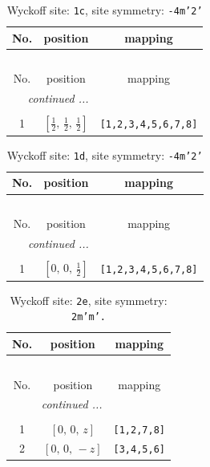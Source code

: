 \documentclass[fleqn,8pt]{jsarticle}
\begin{document}
\begin{longtable}{ccc}
\caption{Wyckoff site: {\tt 1c}, site symmetry: {\tt -4m'2'}}
 \\
 \hline \hline
No. & position & mapping \\ \hline \endfirsthead

\multicolumn{2}{l}{\tablename\ \thetable{}} \\
 \hline \hline
No. & position & mapping \\ \hline \endhead

 \hline \hline
\multicolumn{2}{r}{\footnotesize\it continued ...} \\ \endfoot

 \hline \hline
\multicolumn{2}{r}{} \\ \endlastfoot

1 & $\left[ \frac{1}{2},\, \frac{1}{2},\, \frac{1}{2} \right]$ & {\tt [1,2,3,4,5,6,7,8]} \\
\end{longtable}
\renewcommand{\arraystretch}{1.2}
\begin{longtable}{ccc}
\caption{Wyckoff site: {\tt 1d}, site symmetry: {\tt -4m'2'}}
 \\
 \hline \hline
No. & position & mapping \\ \hline \endfirsthead

\multicolumn{2}{l}{\tablename\ \thetable{}} \\
 \hline \hline
No. & position & mapping \\ \hline \endhead

 \hline \hline
\multicolumn{2}{r}{\footnotesize\it continued ...} \\ \endfoot

 \hline \hline
\multicolumn{2}{r}{} \\ \endlastfoot

1 & $\left[ 0,\, 0,\, \frac{1}{2} \right]$ & {\tt [1,2,3,4,5,6,7,8]} \\
\end{longtable}
\renewcommand{\arraystretch}{1.2}
\begin{longtable}{ccc}
\caption{Wyckoff site: {\tt 2e}, site symmetry: {\tt 2m'm'.}}
 \\
 \hline \hline
No. & position & mapping \\ \hline \endfirsthead

\multicolumn{2}{l}{\tablename\ \thetable{}} \\
 \hline \hline
No. & position & mapping \\ \hline \endhead

 \hline \hline
\multicolumn{2}{r}{\footnotesize\it continued ...} \\ \endfoot

 \hline \hline
\multicolumn{2}{r}{} \\ \endlastfoot

1 & $\left[ 0,\, 0,\, z \right]$ & {\tt [1,2,7,8]} \\ \hline
2 & $\left[ 0,\, 0,\, - z \right]$ & {\tt [3,4,5,6]} \\
\end{longtable}
\end{document}

